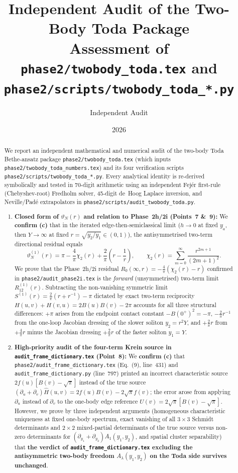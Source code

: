 \documentclass[11pt,a4paper]{article}
\title{\textbf{Independent Audit of the Two-Body Toda Package}\\
\large Assessment of \texttt{phase2/twobody\_toda.tex} and \texttt{phase2/scripts/twobody\_toda\_*.py}}
\author{Independent Audit}
\date{2026}
\begin{document}
\maketitle

\begin{abstract}
We report an independent mathematical and numerical audit of the two-body Toda Bethe-ansatz package \texttt{phase2/twobody\_toda.tex} (which inputs \texttt{phase2/twobody\_toda\_numbers.tex}) and its four verification scripts \texttt{phase2/scripts/twobody\_toda\_*.py}. Every analytical identity is re-derived symbolically and tested in 70-digit arithmetic using an independent Fej\'er first-rule (Chebyshev-root) Fredholm solver, 45-digit de~Hoog Laplace inversion, and Neville/Pad\'e extrapolators in \texttt{phase2/scripts/audit\_twobody\_toda.py}.
\begin{enumerate}[leftmargin=2em]
  \item \textbf{Closed form of $\vartheta_N(r)$ and relation to Phase~2h/2i (Points~7 \&~9):} We \textbf{confirm} \textbf{(c)} that in the iterated edge-then-semiclassical limit ($h\to 0$ at fixed $y_a$, then $Y\to\infty$ at fixed $r=\sqrt{y_2/y_1}\in(0,1)$), the antisymmetrised two-term directional residual equals
  \[
    \vartheta_N^{(1)}(r) = \pi - \frac{4}{\pi}\chi_2(r) + \frac{2}{\pi}\!\left(r - \frac{1}{r}\right), \qquad \chi_2(r)=\sum_{m=0}^{\infty}\frac{r^{2m+1}}{(2m+1)^2}.
  \]
  We prove that the Phase~2h/2i residual $R_0(\infty,r) = -\frac{4}{\pi}(\chi_2(r)-r)$ confirmed in \texttt{phase2/audit\_phase2i.tex} is the \emph{forward} (unsymmetrised) two-term limit $R_{12}^{(1)}(r)$. Subtracting the non-vanishing symmetric limit $S^{(1)}(r) = \frac{2}{\pi}(r+r^{-1})-\pi$ dictated by exact two-term reciprocity $H(u,v)+H(v,u)=2B(u)B(v)-2\pi$ accounts for all three structural differences: $+\pi$ arises from the endpoint contact constant $-B(0^+)^2=-\pi$, $-\frac{2}{\pi}r^{-1}$ from the one-loop Jacobian dressing of the slower soliton $y_2=r^2 Y$, and $+\frac{2}{\pi}r$ from $+\frac{4}{\pi}r$ minus the Jacobian dressing $+\frac{2}{\pi}r$ of the faster soliton $y_1=Y$.
  \item \textbf{High-priority audit of the four-term Krein source in \texttt{audit\_frame\_dictionary.tex} (Point~8):} We \textbf{confirm} \textbf{(c)} that \texttt{phase2/audit\_frame\_dictionary.tex} (Eq.~(9), line~431) and \texttt{audit\_frame\_dictionary.py} (line~797) printed an incorrect characteristic source $2f(u)[B(v)-\sqrt{\pi}]$ instead of the true source $(\partial_u+\partial_v)\widehat{H}(u,v)=2f(u)B(v)-2\sqrt{\pi}f(v)$; the error arose from applying $\partial_u$ instead of $\partial_v$ to the one-body edge reference $U(v)=2\sqrt{\pi}[B(v)-\sqrt{\pi}]$. However, we prove by three independent arguments (homogeneous characteristic uniqueness at fixed one-body spectrum, exact vanishing of all $3\times 3$ Schmidt determinants and $2\times 2$ mixed-partial determinants of the true source versus non-zero determinants for $(\partial_{y_1}+\partial_{y_2})A_1(y_1,y_2)$, and spatial cluster separability) that \textbf{the verdict of \texttt{audit\_frame\_dictionary.tex} excluding the antisymmetric two-body freedom $A_\lambda(y_1,y_2)$ on the Toda side survives unchanged}.

\end{enumerate}
\end{abstract}
\end{document}
